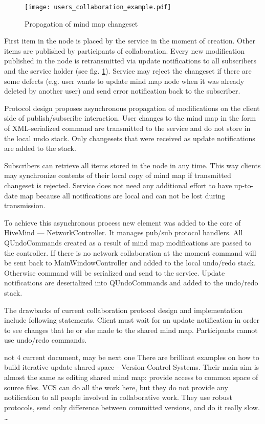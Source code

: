  \begin{figure}[!h]
 \centering
 \texttt{[image: users\_collaboration\_example.pdf]}
 \caption{Propagation of mind map changeset}
 \label{users_collaboration_example}
 \end{figure} 

 First item in the node is placed by the service in the moment of creation. Other
 items are published by participants of collaboration. Every new modification
 published in the node is retransmitted via update notifications to all
 subscribers and the service holder (see fig. \ref{users_collaboration_example}). 
 Service may reject the changeset if there are some defects (e.g. user wants to 
 update mind map node when it was already deleted by another user) and send error
 notification back to the subscriber.

 Protocol design proposes asynchronous propagation of modifications on the client
 side of publish/subscribe interaction. User changes to the mind map in the form
 of XML-serialized command are transmitted to the service and do not store in
 the local undo stack. Only changesets that were received as update notifications
 are added to the stack.

 Subscribers can retrieve all items stored in the node in any time. This
 way clients may synchronize contents of their local copy of mind map if
 transmitted changeset is rejected. Service does not need any additional effort
 to have up-to-date map because all notifications are local and can not be lost
 during transmission.

 To achieve this asynchronous process new element was added to the core of
 HiveMind --- NetworkController. It manages pub/sub protocol handlers. All
 QUndoCommands created as a result of mind map modifications are passed to the
 controller. If there is no network collaboration at the moment command will be
 sent back to MainWindowController and added to the local undo/redo stack.
 Otherwise command will be serialized and send to the service. Update
 notifications are deserialized into QUndoCommands and added to the undo/redo
 stack.

 The drawbacks of current collaboration protocol design and implementation
 include following statements. Client must wait for an update notification in
 order to see changes that he or she made to the shared mind map. Participants
 cannot use undo/redo commands.

 not 4 current document, may be next one
 There are brilliant examples on how to build iterative update shared space -
 Version Control Systems. Their main aim is almost the same as editing shared
 mind map: provide access to common space of source files. VCS can do all the 
 work here, but they do not provide any notification to all people involved in
 collaborative work. They use robust protocols, send only difference between
 committed versions, and do it really slow. \ldots

